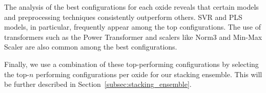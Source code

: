 The analysis of the best configurations for each oxide reveals that certain models and preprocessing techniques consistently outperform others. SVR and PLS models, in particular, frequently appear among the top configurations. The use of transformers such as the Power Transformer and scalers like Norm3 and Min-Max Scaler are also common among the best configurations.

Finally, we use a combination of these top-performing configurations by selecting the top-$n$ performing configurations per oxide for our stacking ensemble.
This will be further described in Section~\ref{subsec:stacking_ensemble}.